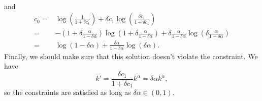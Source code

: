 \begin{example}
\begin{align*}
 \end{align*}
 and 
 \begin{align*}
   c_0 = & \log\left(\frac{1}{1+\delta c_1}\right) + \delta c_1
   \log\left(\frac{\delta c_1}{1+\delta c_1} \right) \\
   = & -\left(1 + \delta \frac{\alpha}{1-\delta \alpha}\right) 
   \log\left(1+\delta  \frac{\alpha}{1-\delta \alpha}\right) + 
   \delta \frac{\alpha}{1-\delta \alpha} 
   \log\left(\delta \frac{\alpha}{1-\delta \alpha} \right) \\
   = & \log(1-\delta \alpha) + \frac{\delta \alpha}{1-\delta \alpha}
   \log(\delta \alpha).
 \end{align*}
 Finally, we should make sure that this solution doesn't violate the
 constraint. We have
 \[ k' = \frac{\delta c_1}{1+\delta c_1} k^\alpha = \delta \alpha
 k^\alpha, \]
 so the constraints are satisfied as long  as $\delta \alpha \in
 (0,1)$.  
\end{example}

